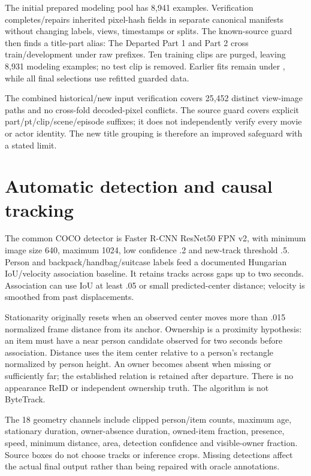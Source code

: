 The initial prepared modeling pool has 8,941 examples. Verification completes/repairs inherited pixel-hash fields in separate canonical manifests without changing labels, views, timestamps or splits. The known-source guard then finds a title-part alias: The Departed Part 1 and Part 2 cross train/development under raw prefixes. Ten training clips are purged, leaving 8,931 modeling examples; no test clip is removed. Earlier fits remain under , while all final selections use refitted guarded data.

The combined historical/new input verification covers 25,452 distinct view-image paths and no cross-fold decoded-pixel conflicts. The source guard covers explicit part/pt/clip/scene/episode suffixes; it does not independently verify every movie or actor identity. The new title grouping is therefore an improved safeguard with a stated limit.

\section{Automatic detection and causal tracking}
The common COCO detector is Faster R-CNN ResNet50 FPN v2, with minimum image size 640, maximum 1024, low confidence .2 and new-track threshold .5. Person and backpack/handbag/suitcase labels feed a documented Hungarian IoU/velocity association baseline. It retains tracks across gaps up to two seconds. Association can use IoU at least .05 or small predicted-center distance; velocity is smoothed from past displacements.

Stationarity originally resets when an observed center moves more than .015 normalized frame distance from its anchor. Ownership is a proximity hypothesis: an item must have a near person candidate observed for two seconds before association. Distance uses the item center relative to a person's rectangle normalized by person height. An owner becomes absent when missing or sufficiently far; the established relation is retained after departure. There is no appearance ReID or independent ownership truth. The algorithm is not ByteTrack.

The 18 geometry channels include clipped person/item counts, maximum age, stationary duration, owner-absence duration, owned-item fraction, presence, speed, minimum distance, area, detection confidence and visible-owner fraction. Source boxes do not choose tracks or inference crops. Missing detections affect the actual final output rather than being repaired with oracle annotations.

